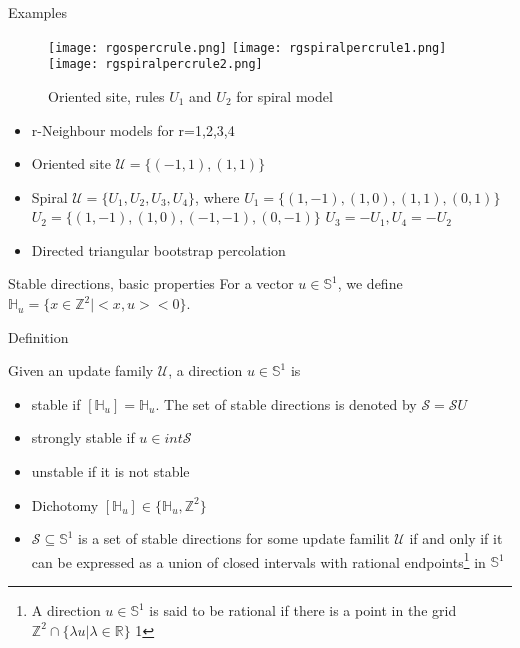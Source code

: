 \documentclass{beamer}
\begin{document}
\begin{frame}{Examples}

\begin{figure}[t]
    \texttt{[image: rgospercrule.png]}
    \texttt{[image: rgspiralpercrule1.png]}
    \texttt{[image: rgspiralpercrule2.png]}
    \caption{Oriented site, rules $U_1$ and $U_2$ for spiral model}
    \label{fig:mesh1}
\end{figure}
\begin{itemize}
    \item r-Neighbour models for r=1,2,3,4
    \item Oriented site $\mathscr{U}=\{(-1,1),(1,1)\}$
    \item Spiral $\mathscr{U}=\{U_1,U_2,U_3,U_4\}$, where 
    $U_1=\{(1,-1),(1,0),(1,1),(0,1)\}$
    \newline
    $U_2=\{(1,-1),(1,0),(-1,-1),(0,-1)\}
    $
    \newline
    $ U_3=-U_1, U_4=-U_2$
    \item Directed triangular bootstrap percolation 
    

\end{itemize}



\end{frame}

\begin{frame}{Stable directions, basic properties}
For a vector $u\in\mathbb{S}^1$, we define $
\mathbb{H}_u=\{x\in\mathbb{Z}^2|<x,u><0\}$.

\begin{block}{Definition}



Given an update family $\mathscr{U}$, a direction $u\in\mathbb{S}^1$ is
\begin{itemize}

    \item stable if $[\mathbb{H}_u]=\mathbb{H}_u$. The set of stable directions is denoted by $\mathscr{S}=\mathscr{S}{U}$
    \item strongly stable if $u\in int\mathscr{S}$
    \item unstable if it is not stable


\end{itemize}
\end{block}


\begin{itemize}
    \item Dichotomy $[\mathbb{H}_u]\in\{\mathbb{H}_u,\mathbb{Z}^2\}$
    \item $\mathscr{S}\subseteq\mathbb{S}^1$ is a set of stable directions for some update familit $\mathscr{U}$ if and only if it can be expressed as a union of closed intervals with rational endpoints\footnote{A direction $u\in\mathbb{S}^1$ is said to be rational if there is a point in the grid $\mathbb{Z}^2\cap\{\lambda u|\lambda\in\mathbb{R}\}$
    1}
    in $\mathbb{S}^1$
\end{itemize}



\end{frame}
\end{document}
